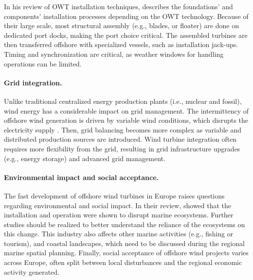 In his review of OWT installation techniques, \citet{jiang_2021_owt_installation_review} describes the foundations' and components' installation processes depending on the OWT technology. 
Because of their large scale, most structural assembly (e.g., blades, or floater) are done on dedicated port docks, making the port choice critical.  
The assembled turbines are then transferred offshore with specialized vessels, such as installation jack-ups. 
Timing and synchronization are critical, as weather windows for handling operations can be limited.


\paragraph{Grid integration.}
Unlike traditional centralized energy production plants (i.e., nuclear and fossil), wind energy has a considerable impact on grid management. 
The intermittency of offshore wind generation is driven by variable wind conditions, which disrupts the electricity supply \citep{heier_2014_grid_integration}. 
Then, grid balancing becomes more complex as variable and distributed production sources are introduced.  
Wind turbine integration often requires more flexibility from the grid, resulting in grid infrastructure upgrades (e.g., energy storage) and advanced grid management. 


\paragraph{Environmental impact and social acceptance.} 
The fast development of offshore wind turbines in Europe raises questions regarding environmental and social impact. 
In their review, \citet{galparsoro_2022_owt_ecological_impact} showed that the installation and operation were shown to disrupt marine ecosystems.  
Further studies should be realized to better understand the reliance of the ecosystems on this change. 
This industry also affects other marine activities (e.g., fishing or tourism), and coastal landscapes, which need to be discussed during the regional marine spatial planning. 
Finally, social acceptance of offshore wind projects varies across Europe, often split between local disturbances and the regional economic activity generated.  


